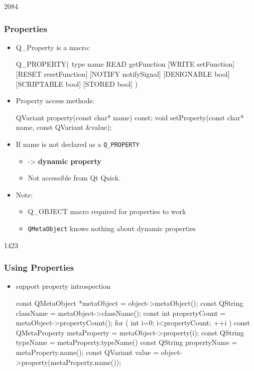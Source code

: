 \begin{slide}[fragile]{2084}
\frametitle{Properties}
\begin{itemize}
  \item Q\_Property is a macro:
\begin{cpp}
  Q_PROPERTY( type name READ getFunction [WRITE setFunction]
  [RESET resetFunction] [NOTIFY notifySignal] [DESIGNABLE bool]
  [SCRIPTABLE bool] [STORED bool] )
\end{cpp}
  \medskip
  \item Property access methods:
\begin{cpp}
  QVariant property(const char* name) const;
  void setProperty(const char* name, const QVariant &value);
\end{cpp}
  \medskip
  \item If name is not declared as a \texttt{Q\_PROPERTY}
  \begin{itemize}
    \item -> \textbf{dynamic property}
    \item Not accessible from Qt Quick.
  \end{itemize}
  \medskip
  \item Note:
  \begin{itemize}
    \item Q\_OBJECT macro required for properties to work
    \item \texttt{QMetaObject} knows nothing about dynamic properties
  \end{itemize}
\end{itemize}
\end{slide}

\begin{slide}[fragile]{1423}
\frametitle{Using Properties}
\begin{itemize}
\item {} support property introspection\smallskip
  \begin{cpp}
  const QMetaObject *metaObject = object->metaObject();
  const QString className = metaObject->className();
  const int propertyCount = metaObject->propertyCount();
  for ( int i=0; i<propertyCount; ++i ) {
    const QMetaProperty metaProperty = metaObject->property(i);
    const QString typeName = metaProperty.typeName()
    const QString propertyName = metaProperty.name();
    const QVariant value = object->property(metaProperty.name());
  }
  \end{cpp}
\end{itemize}
\end{slide}
